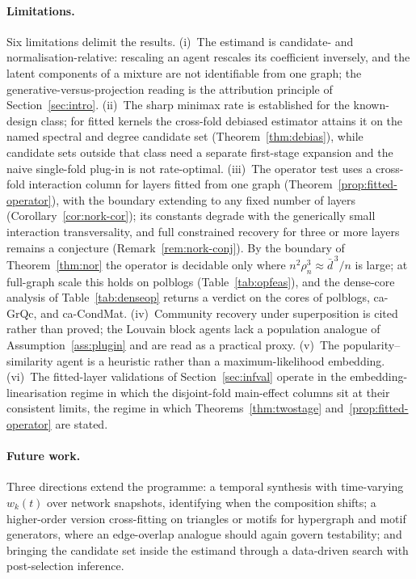 \documentclass[12pt]{article}
\newcommand{\1}{\mathbf{1}}
\begin{document}
\paragraph{Limitations.}
Six limitations delimit the results. (i)~The estimand is candidate- and normalisation-relative: rescaling an agent rescales its coefficient inversely, and the latent components of a mixture are not identifiable from one graph; the generative-versus-projection reading is the attribution principle of Section~\ref{sec:intro}. (ii)~The sharp minimax rate is established for the
known-design class; for fitted kernels the cross-fold debiased estimator attains it on the named
spectral and degree candidate set (Theorem~\ref{thm:debias}), while candidate sets outside that class need a separate
first-stage expansion and the naive single-fold plug-in is not rate-optimal. (iii)~The operator test
uses a cross-fold interaction column for layers fitted from one graph
(Theorem~\ref{prop:fitted-operator}), with the boundary extending to any fixed number of layers
(Corollary~\ref{cor:nork-cor}); its constants degrade with the generically small interaction
transversality, and full constrained recovery for three or more layers remains a conjecture
(Remark~\ref{rem:nork-conj}). By the boundary of Theorem~\ref{thm:nor} the operator is decidable only where $n^2\rho_n^3\approx\bar d^{\,3}/n$ is large; at full-graph scale this holds on \textsf{polblogs} (Table~\ref{tab:opfeas}), and the dense-core analysis of Table~\ref{tab:denseop} returns a verdict on the cores of \textsf{polblogs}, \textsf{ca-GrQc}, and \textsf{ca-CondMat}. (iv)~Community recovery under superposition is cited rather than proved; the Louvain
block agents lack a population analogue of Assumption~\ref{ass:plugin} and are read as a practical
proxy. (v)~The popularity--similarity agent is a heuristic rather than a maximum-likelihood embedding.
(vi)~The fitted-layer validations of Section~\ref{sec:infval} operate in the embedding-linearisation regime in which the disjoint-fold main-effect columns sit at their consistent limits, the regime in which Theorems~\ref{thm:twostage} and~\ref{prop:fitted-operator} are stated.

\paragraph{Future work.}
Three directions extend the programme: a temporal synthesis with time-varying $w_k(t)$ over network
snapshots, identifying when the composition shifts; a higher-order version cross-fitting on triangles
or motifs for hypergraph and motif generators, where an edge-overlap analogue should again govern
testability; and bringing the candidate set inside the estimand through a data-driven search with
post-selection inference.
\end{document}
